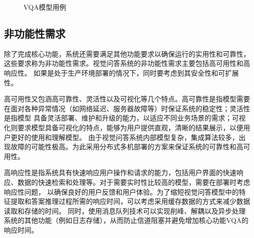 \begin{enumerate}[topsep = 0 pt, itemsep= 0 pt, parsep=0pt, partopsep=0pt, leftmargin=0pt, itemindent=44pt, labelsep=6pt,  listparindent=22pt, label=(\arabic*)]
\begin{figure}[htbp]
        \caption{\label{eg_model}VQA模型用例} 
    \end{figure}
\end{enumerate}

\subsection{非功能性需求}
除了完成核心功能，系统还需要满足其他功能要求以确保运行的实用性和可靠性，这些要求称为非功能性需求。视觉问答系统的非功能性需求主要包括高可用性和高响应性。
如果是处于生产环境部署的情况下，同时要考虑到其安全性和可扩展性。

高可用性又包涵高可靠性、灵活性以及可视化等几个特点。高可靠性是指模型需要在面对各种异常情况（如网络延迟、服务器故障等）时保证系统的稳定性；灵活性是指模型
具备灵活部署、维护和升级的能力，以适应不同业务场景的需求；可视化则要求模型具备可视化的特点，能够为用户提供直观，清晰的结果展示，以便用户更好的使用和理解模型。
由于视觉问答系统内部模型复杂，集成算法较多，出现故障的可能性极高。为此采用分布式多机部署的方案来保证系统的可靠性和高可用性。

高响应性是指系统具有快速响应用户操作和请求的能力，包括用户界面的快速响应、数据的快速检索和处理等。对于需要实时性比较高的模型，需要在部署时考虑响应性问题，
以确保良好的用户反馈和用户体验。为了缩短视觉问答模型中的特征提取和答案推理过程所需的响应时间，可以考虑采用缓存数据的方式来减少数据读取和存储的时间。
同时，使用消息队列技术可以实现削峰、解耦以及异步处理系统的其他功能（例如日志存储），从而防止信道阻塞并避免增加核心功能VQA的响应时间。
